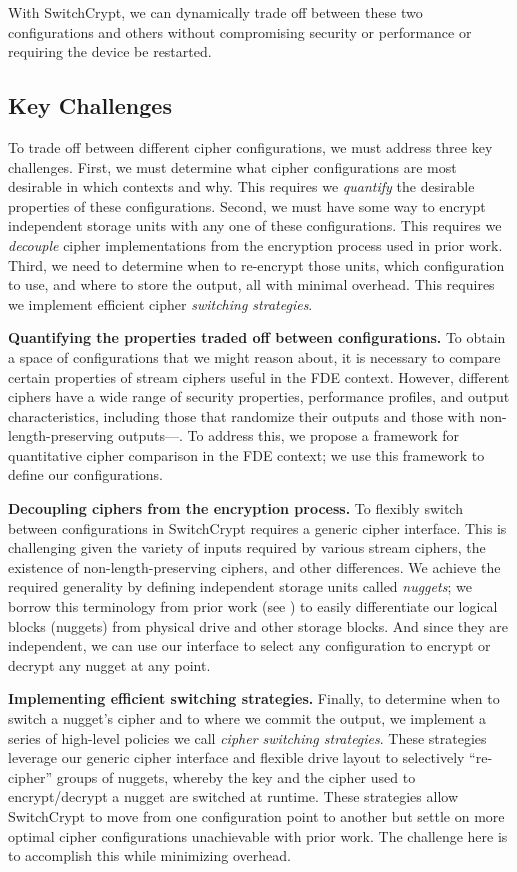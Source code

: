 With SwitchCrypt, we can dynamically trade off between these two configurations
and others without compromising security or performance or requiring the device
be restarted.

\subsection{Key Challenges}

To trade off between different cipher configurations, we must address three key
challenges. First, we must determine what cipher configurations are most
desirable in which contexts and why. This requires we \emph{quantify} the
desirable properties of these configurations. Second, we must have some way to
encrypt independent storage units with any one of these configurations. This
requires we \emph{decouple} cipher implementations from the encryption process
used in prior work. Third, we need to determine when to re-encrypt those units,
which configuration to use, and where to store the output, all with minimal
overhead. This requires we implement efficient cipher \emph{switching
strategies}.

\textbf{Quantifying the properties traded off between configurations.} To obtain
a space of configurations that we might reason about, it is necessary to compare
certain properties of stream ciphers useful in the FDE context. However,
different ciphers have a wide range of security properties, performance
profiles, and output characteristics, including those that randomize their
outputs and those with non-length-preserving outputs---. To address this, we propose a framework for
quantitative cipher comparison in the FDE context; we use this framework to
define our configurations.

\textbf{Decoupling ciphers from the encryption process.} To flexibly switch
between configurations in SwitchCrypt requires a generic cipher interface. This
is challenging given the variety of inputs required by various stream ciphers,
the existence of non-length-preserving ciphers, and other differences. We
achieve the required generality by defining independent storage units called
\emph{nuggets}; we borrow this terminology from prior work (see
\cite{StrongBox}) to easily differentiate our logical blocks (nuggets) from
physical drive and other storage blocks. And since they are independent, we can
use our interface to select any configuration to encrypt or decrypt any nugget
at any point.

\textbf{Implementing efficient switching strategies.} Finally, to determine when
to switch a nugget's cipher and to where we commit the output, we implement a
series of high-level policies we call \textit{cipher switching strategies}.
These strategies leverage our generic cipher interface and flexible drive layout
to selectively ``re-cipher'' groups of nuggets, whereby the key and the cipher
used to encrypt/decrypt a nugget are switched at runtime. These strategies allow
SwitchCrypt to move from one configuration point to another but settle on more
optimal cipher configurations unachievable with prior work. The challenge here
is to accomplish this while minimizing overhead.
